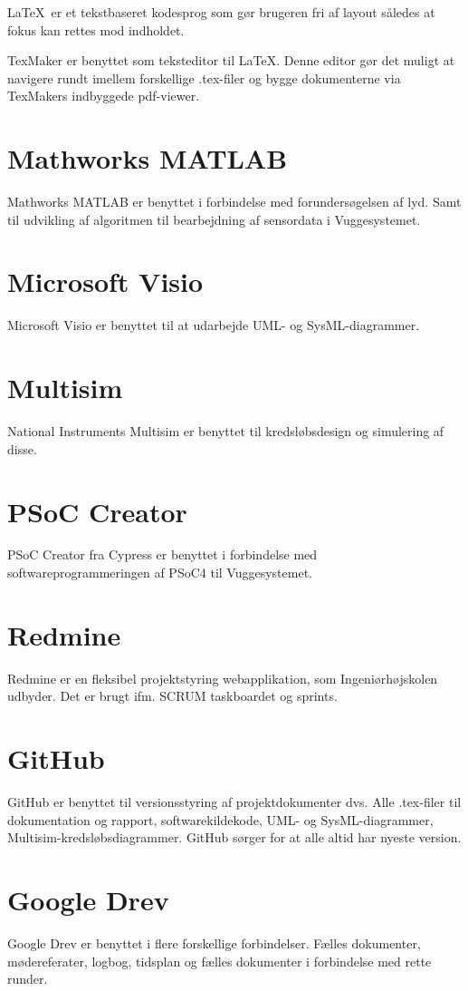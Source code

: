 \LaTeX \ er et tekstbaseret kodesprog som gør brugeren fri af layout således at fokus kan rettes mod indholdet.


TexMaker er benyttet som teksteditor til \LaTeX. Denne editor gør det muligt at navigere rundt imellem forskellige .tex-filer og bygge dokumenterne via TexMakers indbyggede pdf-viewer.

\section*{Mathworks MATLAB}
Mathworks MATLAB er benyttet i forbindelse med forundersøgelsen af lyd. Samt til udvikling af algoritmen til bearbejdning af sensordata i Vuggesystemet.

\section*{Microsoft Visio}
Microsoft Visio er benyttet til at udarbejde UML- og SysML-diagrammer. 

\section*{Multisim}
National Instruments Multisim er benyttet til kredsløbsdesign og simulering af disse. 

\section*{PSoC Creator}
PSoC Creator fra Cypress er benyttet i forbindelse med softwareprogrammeringen af PSoC4 til Vuggesystemet. 

\section*{Redmine}
Redmine er en fleksibel projektstyring webapplikation, som Ingeniørhøjskolen udbyder. Det er brugt ifm. SCRUM taskboardet og sprints.

\section*{GitHub}
GitHub er benyttet til versionsstyring af projektdokumenter dvs. Alle .tex-filer til dokumentation og rapport, softwarekildekode, UML- og SysML-diagrammer, Multisim-kredsløbsdiagrammer. GitHub sørger for at alle altid har nyeste version. 

\section*{Google Drev}
Google Drev er benyttet i flere forskellige forbindelser. Fælles dokumenter, mødereferater, logbog, tidsplan og fælles dokumenter i forbindelse med rette runder.